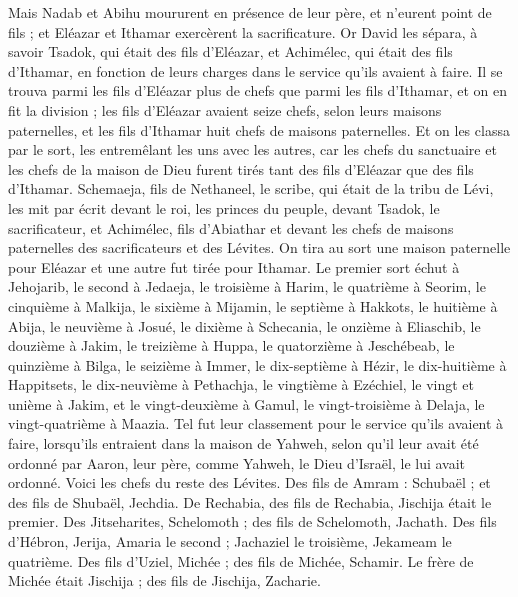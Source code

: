 \begin{multicols}{2}
Mais Nadab et Abihu moururent en présence de leur père, et n'eurent point de fils ; et Eléazar et Ithamar exercèrent la sacrificature.
Or David les sépara, à savoir Tsadok, qui était des fils d'Eléazar, et Achimélec, qui était des fils d'Ithamar, en fonction de leurs charges dans le service qu'ils avaient à faire.
Il se trouva parmi les fils d'Eléazar plus de chefs que parmi les fils d'Ithamar, et on en fit la division ; les fils d'Eléazar avaient seize chefs, selon leurs maisons paternelles, et les fils d'Ithamar huit chefs de maisons paternelles.
Et on les classa par le sort, les entremêlant les uns avec les autres, car les chefs du sanctuaire et les chefs de la maison de Dieu furent tirés tant des fils d'Eléazar que des fils d'Ithamar.
Schemaeja, fils de Nethaneel, le scribe, qui était de la tribu de Lévi, les mit par écrit devant le roi, les princes du peuple, devant Tsadok, le sacrificateur, et Achimélec, fils d'Abiathar et devant les chefs de maisons paternelles des sacrificateurs et des Lévites. On tira au sort une maison paternelle pour Eléazar et une autre fut tirée pour Ithamar.
Le premier sort échut à Jehojarib, le second à Jedaeja,
le troisième à Harim, le quatrième à Seorim,
le cinquième à Malkija, le sixième à Mijamin,
le septième à Hakkots, le huitième à Abija,
le neuvième à Josué, le dixième à Schecania,
le onzième à Eliaschib, le douzième à Jakim,
le treizième à Huppa, le quatorzième à Jeschébeab,
le quinzième à Bilga, le seizième à Immer,
le dix-septième à Hézir, le dix-huitième à Happitsets,
le dix-neuvième à Pethachja, le vingtième à Ezéchiel,
le vingt et unième à Jakim, et le vingt-deuxième à Gamul,
le vingt-troisième à Delaja, le vingt-quatrième à Maazia.
Tel fut leur classement pour le service qu'ils avaient à faire, lorsqu'ils entraient dans la maison de Yahweh, selon qu'il leur avait été ordonné par Aaron, leur père, comme Yahweh, le Dieu d'Israël, le lui avait ordonné.
Voici les chefs du reste des Lévites. Des fils de Amram : Schubaël ; et des fils de Shubaël, Jechdia.
De Rechabia, des fils de Rechabia, Jischija était le premier.
Des Jitseharites, Schelomoth ; des fils de Schelomoth, Jachath.
Des fils d'Hébron, Jerija, Amaria le second ; Jachaziel le troisième, Jekameam le quatrième.
Des fils d'Uziel, Michée ; des fils de Michée, Schamir.
Le frère de Michée était Jischija ; des fils de Jischija, Zacharie.

\end{multicols}
